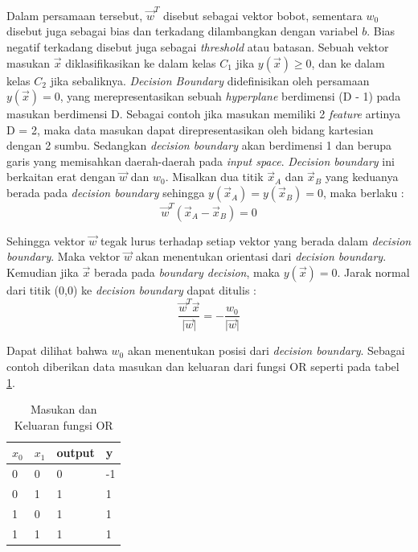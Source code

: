 Dalam persamaan tersebut, $\vec{w}^T$ disebut sebagai vektor bobot, sementara $w_0$ disebut juga sebagai bias dan terkadang dilambangkan dengan variabel $b$. Bias negatif terkadang disebut juga sebagai \textit{threshold} atau batasan. Sebuah vektor masukan $\vec{x}$ diklasifikasikan ke dalam kelas $C_1$ jika $y(\vec{x}) \geq 0$, dan ke dalam kelas $C_2$ jika sebaliknya. \textit{Decision Boundary} didefinisikan oleh persamaan $y(\vec{x}) = 0$, yang merepresentasikan sebuah \textit{hyperplane} berdimensi (D - 1) pada masukan berdimensi D. Sebagai contoh jika masukan memiliki 2 \textit{feature} artinya D = 2, maka data masukan dapat direpresentasikan oleh bidang kartesian dengan 2 sumbu. Sedangkan \textit{decision boundary} akan berdimensi 1 dan berupa garis yang memisahkan daerah-daerah pada \textit{input space}. \textit{Decision boundary} ini berkaitan erat dengan $\vec{w}$ dan $w_0$. Misalkan dua titik $\vec{x}_A$ dan $\vec{x}_B$ yang keduanya berada pada \textit{decision boundary} sehingga $y(\vec{x}_A) = y(\vec{x}_B) = 0$, maka berlaku :
\begin{equation}
    \vec{w}^T(\vec{x}_A - \vec{x}_B) = 0
\end{equation}

Sehingga vektor $\vec{w}$ tegak lurus terhadap setiap vektor yang berada dalam \textit{decision boundary}\cite{bishop_2006}. Maka vektor $\vec{w}$ akan menentukan orientasi dari \textit{decision boundary}. Kemudian jika $\vec{x}$ berada pada \textit{boundary decision}, maka $y(\vec{x})=0$. Jarak normal dari titik (0,0) ke \textit{decision boundary} dapat ditulis :
\begin{equation}
    \frac{\vec{w}^T \vec{x}}{\lvert\vec{w}\rvert} = -\frac{w_0}{\lvert\vec{w}\rvert}
    \label{eq: jarak origin ke decision boundary}
\end{equation}

Dapat dilihat bahwa $w_0$ akan menentukan posisi dari \textit{decision boundary}. Sebagai contoh diberikan  data masukan dan keluaran dari fungsi OR seperti pada tabel \ref{tab : Dataset OR}.
\begin{table}[!ht]
    \caption{Masukan dan Keluaran fungsi OR}
    \centering
    \begin{tabular}{||l|l|l|l||}
    \hline
        $x_0$ & $x_1$ & output & y  \\ [0.5ex]
        \hline\hline
        0 & 0 & 0 & -1  \\ \hline
        0 & 1 & 1 & 1  \\ \hline
        1 & 0 & 1 & 1  \\ \hline
        1 & 1 & 1 & 1  \\ \hline
    \end{tabular}
    \label{tab : Dataset OR}
\end{table}

